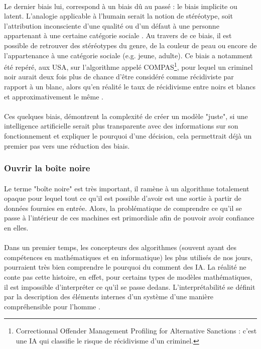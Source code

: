 \documentclass[10pt, french, a4paper]{article}
\begin{document}
\paragraph{}
Le dernier biais lui, correspond à un biais dû au passé : le biais implicite ou latent. L’analogie applicable à l’humain serait la notion de stéréotype, soit l’attribution inconsciente d’une qualité ou d’un défaut à une personne appartenant à une certaine catégorie sociale \citep{greenwald_implicit_1995}. Au travers de ce biais, il est possible de retrouver des stéréotypes du genre, de la couleur de peau ou encore de l’appartenance à une catégorie sociale (e.g. jeune, adulte). Ce biais a notamment été repéré, aux USA, sur l’algorithme appelé COMPAS\footnote{Correctionnal Offender Management Profiling for Alternative Sanctions : c’est une IA qui classifie le risque de récidivisme d’un criminel.}, pour lequel un criminel noir aurait deux fois plus de chance d’être considéré comme récidiviste par rapport à un blanc, alors qu’en réalité le taux de récidivisme entre noirs et blancs et approximativement le même \citep{larson_how_2016}.

\paragraph{}
Ces quelques biais, démontrent la complexité de créer un modèle "juste", si une intelligence artificielle serait plus transparente avec des informations sur son fonctionnement et expliquer le pourquoi d’une décision, cela permettrait déjà un premier pas vers une réduction des biais.

\subsubsection{Ouvrir la boîte noire}

\paragraph{}
Le terme "boîte noire" est très important, il ramène à un algorithme totalement opaque pour lequel tout ce qu’il est possible d’avoir est une sortie à partir de données fournies en entrée. Alors, la problématique de comprendre ce qu’il se passe à l’intérieur de ces machines est primordiale afin de pouvoir avoir confiance en elles.

\paragraph{}
Dans un premier temps, les concepteurs des algorithmes (souvent ayant des compétences en mathématiques et en informatique) les plus utilisés de nos jours, pourraient très bien comprendre le pourquoi du comment des IA. La réalité ne conte pas cette histoire, en effet, pour certains types de modèles mathématiques, il est impossible d’interpréter ce qu’il se passe dedans. L’interprétabilité se définit par la description des éléments internes d’un système d’une manière compréhensible pour l’homme \citep{gilpin_explaining_2018}.
\end{document}
